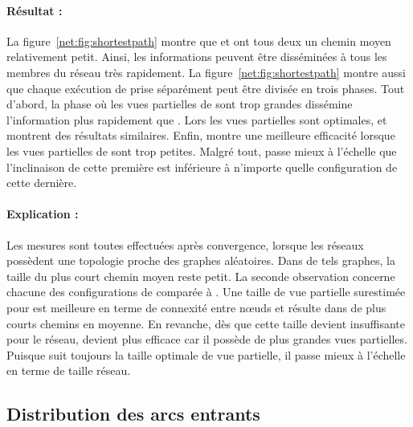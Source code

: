 \paragraph{Résultat :} La figure~\ref{net:fig:shortestpath} montre que \CYCLON
et \SPRAY ont tous deux un chemin moyen relativement petit. Ainsi, les
informations peuvent être disséminées à tous les membres du réseau très
rapidement. La figure~\ref{net:fig:shortestpath} montre aussi que chaque
exécution de \CYCLON prise séparément peut être divisée en trois phases.  Tout
d'abord, la phase où les vues partielles de \CYCLON sont trop grandes dissémine
l'information plus rapidement que \SPRAY. Lors les vues partielles sont
optimales, \CYCLON et \SPRAY montrent des résultats similaires. Enfin, \SPRAY
montre une meilleure efficacité lorsque les vues partielles de \CYCLON sont trop
petites. Malgré tout, \SPRAY passe mieux à l'échelle que \CYCLON l'inclinaison
de cette première est inférieure à n'importe quelle configuration de cette
dernière.

\paragraph{Explication :} Les mesures sont toutes effectuées après convergence,
lorsque les réseaux possèdent une topologie proche des graphes aléatoires.  Dans
de tels graphes, la taille du plus court chemin moyen reste petit.  La seconde
observation concerne chacune des configurations de \CYCLON comparée à
\SPRAY. Une taille de vue partielle surestimée pour \CYCLON est meilleure en
terme de connexité entre nœuds et résulte dans de plus courts chemins en
moyenne. En revanche, dès que cette taille devient insuffisante pour le réseau,
\SPRAY devient plus efficace car il possède de plus grandes vues
partielles. Puisque \SPRAY suit toujours la taille optimale de vue partielle, il
passe mieux à l'échelle en terme de taille réseau.

\subsection{Distribution des arcs entrants}
\label{net:subsec:inview}

